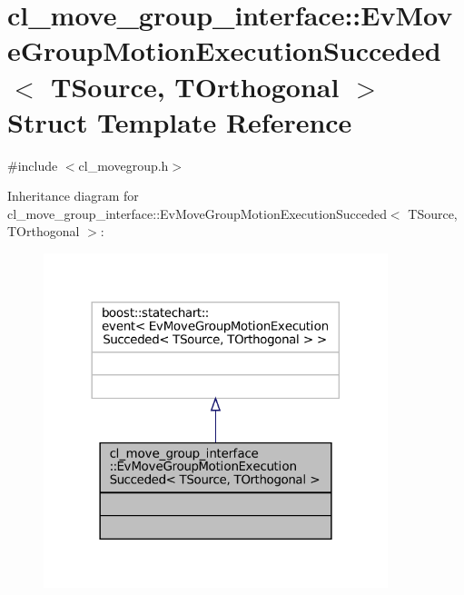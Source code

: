 \hypertarget{structcl__move__group__interface_1_1EvMoveGroupMotionExecutionSucceded}{}\section{cl\+\_\+move\+\_\+group\+\_\+interface\+:\+:Ev\+Move\+Group\+Motion\+Execution\+Succeded$<$ T\+Source, T\+Orthogonal $>$ Struct Template Reference}
\label{structcl__move__group__interface_1_1EvMoveGroupMotionExecutionSucceded}


{\ttfamily \#include $<$cl\+\_\+movegroup.\+h$>$}



Inheritance diagram for cl\+\_\+move\+\_\+group\+\_\+interface\+:\+:Ev\+Move\+Group\+Motion\+Execution\+Succeded$<$ T\+Source, T\+Orthogonal $>$\+:
\nopagebreak
\begin{figure}[H]
\begin{center}
\leavevmode
\includegraphics[width=284pt]{structcl__move__group__interface_1_1EvMoveGroupMotionExecutionSucceded__inherit__graph}
\end{center}
\end{figure}


